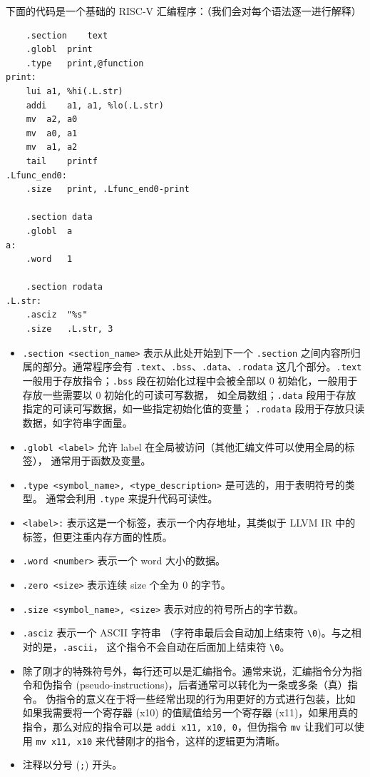 下面的代码是一个基础的 RISC-V 汇编程序：（我们会对每个语法逐一进行解释）
\begin{lstlisting}
	.section	text
	.globl	print
	.type	print,@function
print:
	lui	a1, %hi(.L.str)
	addi	a1, a1, %lo(.L.str)
	mv	a2, a0
	mv	a0, a1
	mv	a1, a2
	tail	printf
.Lfunc_end0:
	.size	print, .Lfunc_end0-print

	.section data
	.globl	a
a:
	.word	1

	.section rodata
.L.str:
	.asciz	"%s"
	.size	.L.str, 3
\end{lstlisting}
\begin{itemize}
  \item \texttt{.section <section\_name>} 表示从此处开始到下一个
    \texttt{.section} 之间内容所归属的部分。通常程序会有
    \texttt{.text}、\texttt{.bss}、\texttt{.data}、\texttt{.rodata}
    这几个部分。\texttt{.text} 一般用于存放指令；\texttt{.bss}
    段在初始化过程中会被全部以 0 初始化，一般用于存放一些需要以 0 初始化的可读可写数据，
    如全局数组；\texttt{.data} 段用于存放指定的可读可写数据，如一些指定初始化值的变量；
    \texttt{.rodata} 段用于存放只读数据，如字符串字面量。
  \item \texttt{.globl <label>} 允许 label 在全局被访问（其他汇编文件可以使用全局的标签），
    通常用于函数及变量。
  \item \texttt{.type <symbol\_name>, <type\_description>} 是可选的，用于表明符号的类型。
    通常会利用 \texttt{.type} 来提升代码可读性。
  \item \texttt{<label>:} 表示这是一个标签，表示一个内存地址，其类似于 LLVM IR
    中的标签，但更注重内存方面的性质。
  \item \texttt{.word <number>} 表示一个 word 大小的数据。
  \item \texttt{.zero <size>} 表示连续 size 个全为 0 的字节。
  \item \texttt{.size <symbol\_name>, <size>} 表示对应的符号所占的字节数。
  \item \texttt{.asciz} 表示一个 ASCII 字符串
    （字符串最后会自动加上结束符 \texttt{\textbackslash0})。与之相对的是，\texttt{.ascii}，
    这个指令不会自动在后面加上结束符 \texttt{\textbackslash0}。
  \item 除了刚才的特殊符号外，每行还可以是汇编指令。通常来说，汇编指令分为指令和伪指令
    (pseudo-instructions)，后者通常可以转化为一条或多条（真）指令。
    伪指令的意义在于将一些经常出现的行为用更好的方式进行包装，比如如果我需要将一个寄存器
    (x10) 的值赋值给另一个寄存器 (x11)，如果用真的指令，那么对应的指令可以是
    \texttt{addi x11, x10, 0}，但伪指令 \texttt{mv} 让我们可以使用
    \texttt{mv x11, x10} 来代替刚才的指令，这样的逻辑更为清晰。
  \item 注释以分号 (\texttt{;}) 开头。
\end{itemize}

